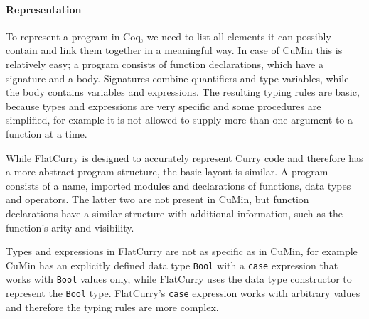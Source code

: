 \documentclass[paper = a4, fleqn, abstract=on, twoside]{scrreprt}
\begin{document}
\paragraph{Representation}
To represent a program in Coq, we need to list all elements it can possibly contain and link them together in a meaningful way. In case of CuMin this is relatively easy; a program consists of function declarations, which have a signature and a body. Signatures combine quantifiers and type variables, while the body contains variables and expressions. The resulting typing rules are basic, because types and expressions are very specific and some procedures are simplified, for example it is not allowed to supply more than one argument to a function at a time. 
\par
While FlatCurry is designed to accurately represent Curry code and therefore has a more abstract program structure, the basic layout is similar. A program consists of a name, imported modules and declarations of functions, data types and operators. The latter two are not present in CuMin, but function declarations have a similar structure with additional information, such as the function's arity and visibility.
\par
Types and expressions in FlatCurry are not as specific as in CuMin, for example CuMin has an explicitly defined data type \texttt{Bool} with a \texttt{case} expression that works with \texttt{Bool} values only, while FlatCurry uses the data type constructor to represent the \texttt{Bool} type. FlatCurry's \texttt{case} expression works with arbitrary values and therefore the typing rules are more complex.\\
\end{document}
